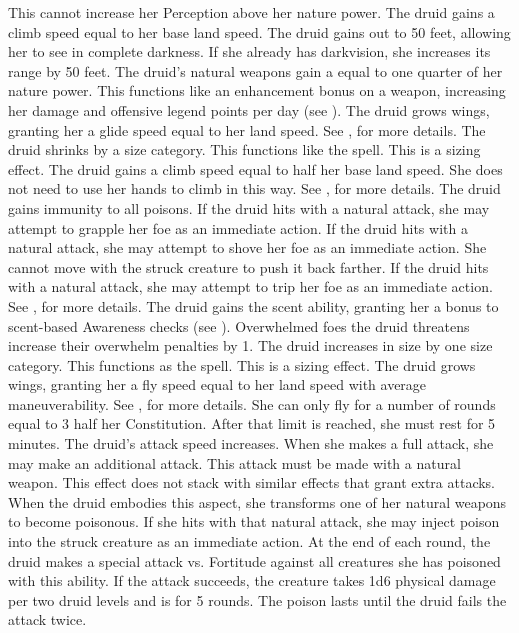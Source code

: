 This cannot increase her Perception above her nature power.
The druid gains a climb speed equal to her base land speed.
The druid gains  out to 50 feet, allowing her to see in complete darkness.
If she already has darkvision, she increases its range by 50 feet.
The druid's natural weapons gain a  equal to one quarter of her nature power.
This functions like an enhancement bonus on a weapon, increasing her damage and offensive legend points per day (see ).
The druid grows wings, granting her a glide speed equal to her land speed.
See , for more details.
The druid shrinks by a size category.
This functions like the  spell.
This is a sizing effect.
The druid gains a climb speed equal to half her base land speed.
She does not need to use her hands to climb in this way.
See , for more details.
The druid gains immunity to all poisons.
If the druid hits with a natural attack, she may attempt to grapple her foe as an immediate action.
If the druid hits with a natural attack, she may attempt to shove her foe as an immediate action.
She cannot move with the struck creature to push it back farther.
If the druid hits with a natural attack, she may attempt to trip her foe as an immediate action.
See , for more details.
The druid gains the scent ability, granting her a  bonus to scent-based Awareness checks (see ).
Overwhelmed foes the druid threatens increase their overwhelm penalties by 1.
The druid increases in size by one size category.
This functions as the  spell.
This is a sizing effect.
The druid grows wings, granting her a fly speed equal to her land speed with average maneuverability.
See , for more details.
She can only fly for a number of rounds equal to 3 \add half her Constitution.
After that limit is reached, she must rest for 5 minutes.
The druid's attack speed increases.
When she makes a full attack, she may make an additional attack.
This attack must be made with a natural weapon.
This effect does not stack with similar effects that grant extra attacks.
When the druid embodies this aspect, she transforms one of her natural weapons to become poisonous.
If she hits with that natural attack, she may inject poison into the struck creature as an immediate action.
At the end of each round, the druid makes a special attack vs. Fortitude against all creatures she has poisoned with this ability.
If the attack succeeds, the creature takes 1d6 physical damage per two druid levels and is \sickened for 5 rounds.
The poison lasts until the druid fails the attack twice.

